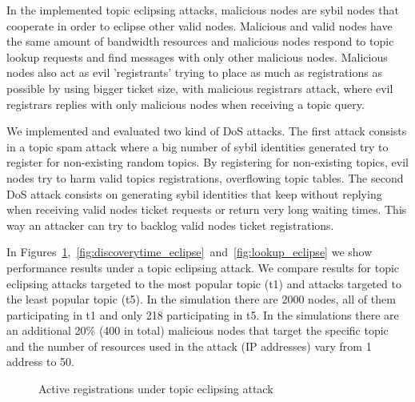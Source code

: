 In the implemented topic eclipsing attacks,  malicious nodes are sybil nodes that cooperate in order to eclipse other valid nodes.
Malicious and valid nodes have the same amount of bandwidth resources and malicious nodes respond to topic lookup requests and find messages with only other malicious nodes.
Malicious nodes also act as evil 'registrants' trying to place as much as registrations as possible by using bigger ticket size,  with malicious registrars attack, where evil registrars replies with only malicious nodes when receiving a topic query.

We implemented and evaluated two kind of DoS attacks.  
The first attack consists in a topic spam attack where a big number of sybil identities generated try to register for non-existing random topics.
By registering for non-existing topics,  evil nodes try to harm valid topics registrations, overflowing topic tables.
The second DoS attack consists on generating sybil identities that keep without replying when receiving valid nodes ticket requests or return very long waiting times. 
This way an attacker can try to backlog valid nodes ticket registrations.

In Figures~\ref{fig:reg_eclipse},~\ref{fig:discoverytime_eclipse}~and~\ref{fig:lookup_eclipse} we show performance results under a
topic eclipsing attack.
We compare results for topic eclipsing attacks targeted to the most popular topic (t1) and attacks targeted to the least popular topic (t5). 
In the simulation there are 2000 nodes, all of them participating in t1 and only 218 participating in t5. 
In the simulations there are an additional 20\% (400 in total) malicious nodes that target the specific topic and the number of resources used in the attack (IP addresses) vary from 1 address to 50.

\begin{figure}[!h]
\centering
{} 
\hspace{-0.15cm}
 \caption{Active registrations under topic eclipsing attack} 
\label{fig:reg_eclipse}
\vspace{-0.15in}
\end{figure}   

